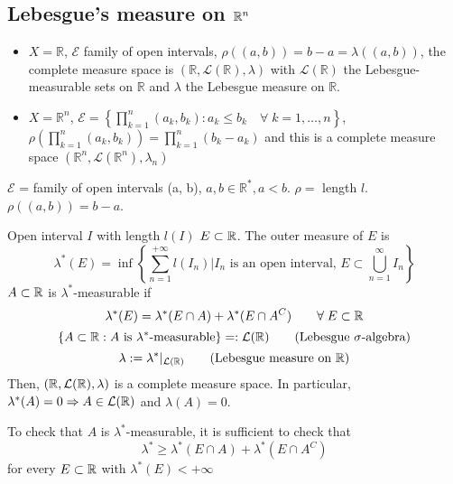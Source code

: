 \subsection{Lebesgue's measure on \texorpdfstring{\(\mathbb{R}^n\)}{Rn}}
\begin{itemize}
\item \(X = \mathbb{R}\), \(\mathcal{E}\) family of open intervals, \(\rho((a,b)) = b-a = \lambda((a,b))\), the complete measure space is \((\mathbb{R}, \mathcal{L}(\mathbb{R}), \lambda)\) with \(\mathcal{L}(\mathbb{R})\) the Lebesgue-measurable sets on \(\mathbb{R}\) and \(\lambda\) the Lebesgue measure on \(\mathbb{R}\).
\item \(X = \mathbb{R}^n\), \(\mathcal{E} = \left\lbrace \prod_{k = 1}^n (a_k, b_k): a_k \leq b_k \quad \forall \; k = 1,\ldots, n \right\rbrace\), \(\rho\left(\prod_{k = 1}^n (a_k, b_k)\right) = \prod_{k=1}^n (b_k - a_k)\) and this is a complete measure space \((\mathbb{R}^n, \mathcal{L}(\mathbb{R}^n), \lambda_n)\)
\end{itemize}
\begin{notation}
    \(\mathcal{E}\) = family of open intervals (a, b), \(a,b \in \mathbb{R}^*, a < b\). \(\rho =\) length \(l\).
    \(\rho((a,b)) = b - a\). 

    Open interval \(I\) with length \(l(I)\)
    \(E \subset \mathbb{R}\). The outer measure of \(E\) is 
    \[
        \lambda^*(E) = \inf \left\lbrace \sum_{n=1}^{+\infty} l(I_n) \vert I_n \mbox{ is an open interval, } E \subset \bigcup_{n = 1}^{\infty} I_n \right\rbrace
    \]
    \(A \subset \mathbb{R}\) is \(\lambda^*\)-measurable if 
    \[
        \lambda^*(E) = \lambda^*(E \cap A) + \lambda^*(E \cap A^C) \qquad \forall \; E \subset \mathbb{R}
    \]
    \[
        \left\lbrace A \subset \real : A \mbox{ is }\lambda^*\mbox{-measurable} \right\rbrace =: \mathcal{L}(\real)
    \tag*{(Lebesgue \(\sigalg\))}\]
    \[
        \lambda := \lambda^* \vert_{\mathcal{L}(\real)}
    \tag*{(Lebesgue measure on \(\real\))}\]
    Then, \((\mathbb{R}, \mathcal{L}(\mathbb{R}), \lambda)\) is a complete measure space. In particular, \(\lambda^*(A) = 0 \Rightarrow A \in \mathcal{L}(\mathbb{R})\) and \(\lambda(A) = 0\).
\end{notation}
\begin{remark}
    To check that \(A\) is \(\lambda^*\)-measurable, it is sufficient to check that 
    \[
        \lambda^* \geq \lambda^*(E \cap A) + \lambda^*(E \cap A^C)
    \] for every \(E \subset \mathbb{R}\) with \(\lambda^*(E) < +\infty\)
\end{remark}
